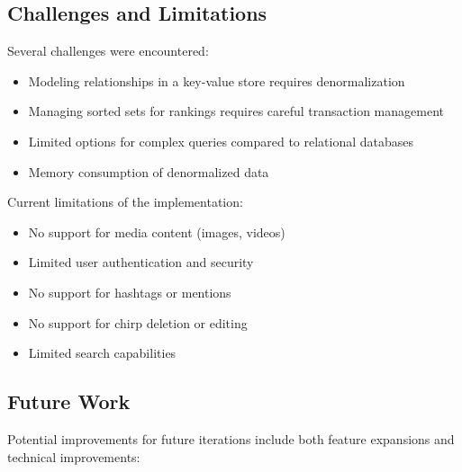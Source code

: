 \documentclass[a4paper,11pt]{article}
\begin{document}
\subsection{Challenges and Limitations}
Several challenges were encountered:

\begin{itemize}
    \item Modeling relationships in a key-value store requires denormalization
    \item Managing sorted sets for rankings requires careful transaction management
    \item Limited options for complex queries compared to relational databases
    \item Memory consumption of denormalized data
\end{itemize}

Current limitations of the implementation:

\begin{itemize}
    \item No support for media content (images, videos)
    \item Limited user authentication and security
    \item No support for hashtags or mentions
    \item No support for chirp deletion or editing
    \item Limited search capabilities
\end{itemize}

\subsection{Future Work}
Potential improvements for future iterations include both feature expansions and technical improvements:
\end{document}
